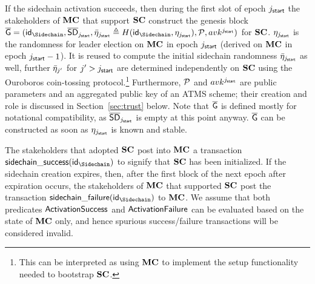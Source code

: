     If the sidechain activation succeeds, then during the first slot of epoch $j_{\mathsf{start}}$
    the stakeholders of $\mathbf{MC}$ that support $\mathbf{SC}$  construct the genesis block
    $
    \Genesisb
    =(
      \id_\Sidechain,
      \SDb_{\jstart},
      \rndb_{\jstart}\defeq H( \id_\Sidechain, \rnd_{\jstart}),
      \params,
      avk^{\jstart}
    )
    $
    for $\mathbf{SC}$. $\eta_{j_{\mathsf{start}}}$ is the
    randomness for leader election on $\mathbf{MC}$ in epoch $j_{\mathsf{start}}$ (derived
    on $\mathbf{MC}$ in epoch $j_{\mathsf{start}}-1$). It is reused to compute the
    initial sidechain randomness
    $\bar{\eta}_{j_{\mathsf{start}}}$ as well, further
    $\bar{\eta}_{j'}$ for $j'>j_{\mathsf{start}}$ are determined independently on $\mathbf{SC}$ using
    the Ouroboros coin-tossing protocol.\footnote{This can be interpreted as
    using $\mathbf{MC}$ to implement the setup functionality needed to bootstrap $\mathbf{SC}$.
    }
    Furthermore, $\mathcal{P}$ and $avk^{j_{\mathsf{start}}}$ are public parameters and an aggregated public
    key of an ATMS scheme; their creation and role is
    discussed in Section~\ref{sec:trust} below.
    Note that $\mathsf{\overline{G}}$ is defined mostly for notational compatibility, as
    $\mathsf{\overline{SD}}_{j_{\mathsf{start}}}$ is empty at this point anyway.
    $\mathsf{\overline{G}}$ can be constructed as soon as %
    $\eta_{j_{\mathsf{start}}}$ is known and stable.

    The stakeholders that adopted $\mathbf{SC}$ post into $\mathbf{MC}$
    a transaction $\mathsf{sidechain\_success}(\id_\Sidechain)$ to
    signify that $\mathbf{SC}$ has been initialized.
    If the sidechain creation expires, then, after the first block of the next
    epoch after expiration occurs, the stakeholders of $\mathbf{MC}$ that supported
    $\mathbf{SC}$ post the transaction $\mathsf{sidechain\_failure}(\id_\Sidechain)$ to $\mathbf{MC}$.
    We assume that both predicates $\mathsf{ActivationSuccess}$ and $\mathsf{ActivationFailure}$ can be evaluated
    based on the state of $\mathbf{MC}$ only, and hence spurious success/failure
    transactions will be considered invalid.



